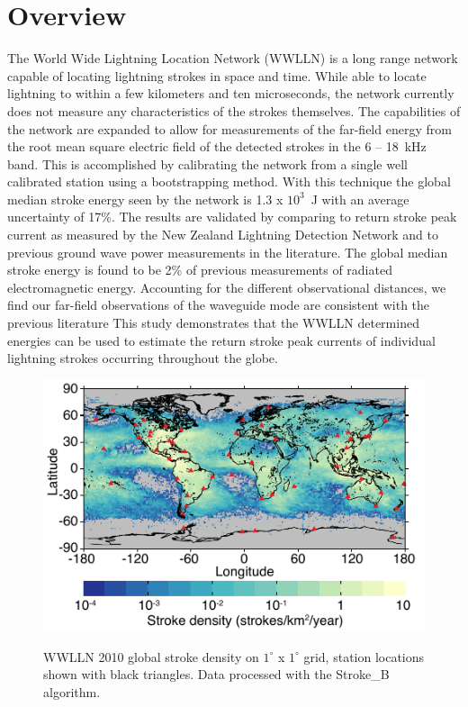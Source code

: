 \section{Overview}

The World Wide Lightning Location Network (WWLLN) is a long range network capable of locating lightning strokes in space and time.
While able to locate lightning to within a few kilometers and ten microseconds, the network currently does not measure any characteristics of the strokes themselves.
The capabilities of the network are expanded to allow for measurements of the far-field energy from the root mean square electric field of the detected strokes in the 6 -- 18~kHz band.
This is accomplished by calibrating the network from a single well calibrated station using a bootstrapping method.
With this technique the global median stroke energy seen by the network is 1.3 x $10^3$~J with an average uncertainty of 17\%.
The results are validated by comparing to return stroke peak current as measured by the New Zealand Lightning Detection Network and to previous ground wave power measurements in the literature.
The global median stroke energy is found to be 2\% of previous measurements of radiated electromagnetic energy.
Accounting for the different observational distances, we find our far-field observations of the waveguide mode are consistent with the previous literature
This study demonstrates that the WWLLN determined energies can be used to estimate the return stroke peak currents of individual lightning strokes occurring throughout the globe.

\begin{figure}[ht!]
\centering
\includegraphics[scale=1.5]{energy/Figures/PPS_WWLLN_2010.pdf}\\
\caption{WWLLN 2010 global stroke density on $1^\circ$ x $1^\circ$ grid, station locations shown with black triangles. Data processed with the Stroke\_B algorithm.}
\label{energy:fig:wwlln_dist}
\end{figure}

